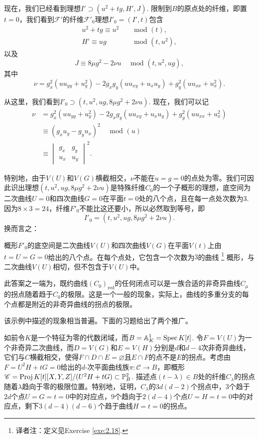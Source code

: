 现在，我们已经看到理想$I'\supset (u^2+tg,H',J)$. 限制到$B$的原点处的纤维，即置$t=0$，我们看到$\mathscr F'$的纤维$\mathscr F'_0$理想$I'_0=(I',t)$包含
\[
	\begin{aligned}
		u^2+tg \equiv u^2 &\quad \text{ mod } (t),\\
		H' \equiv ug &\quad \text{ mod } (t,u^2),
	\end{aligned}
\]
以及
\[
	J\equiv 8\mu g^2-2\nu u\quad \text{ mod } (t,u^2,ug),
\]
其中
\[
	\nu=g_x^2(uu_{yy}+u_y^2)-2g_xg_y(uu_{xy}+u_xu_y)+g_y^2(uu_{xx}+u_x^2).
\]

从这里，我们看到$I'_0\supset (t,u^2,ug,8\mu g^2+2\nu u)$. 现在，我们可以记
\[
	\begin{aligned}
		\nu &=g_x^2(uu_{yy}+u_y^2)-2g_xg_y(uu_{xy}+u_xu_y)+g_y^2(uu_{xx}+u_x^2)\\
		&\equiv (g_xu_y-g_yu_x)^2\quad \text{ mod } (u)\\
		&\equiv \begin{vmatrix}
			g_x&g_y\\
			u_x&u_y
		\end{vmatrix}^2.
	\end{aligned}
\]

特别地，由于$V(U)$和$V(G)$横截相交，$\nu$不能在$u=g=0$的点处为零。我们可因此识出理想$(t,u^2,ug,8\mu g^2+2\nu u)$是特殊纤维$C_0$的一个子概形的理想，底空间为二次曲线$U=0$和四次曲线$G=0$在平面$t=0$处的八个点，且在每一点处次数为$3$. 因为$8\times 3=24$，纤维$F'_0$不能比这还要小，所以必然取到等号，即
\[
	I'_0=(t,u^2,ug,8\mu g^2+2\nu u).
\]
换而言之：

\begin{pro}\label{pro:4.10}
	概形$F'_0$的底空间是二次曲线$V(U)$和四次曲线$V(G)$在平面$V(t)$上由$t=U=G=0$给出的八个点。在每个点处，它包含一个次数为$3$的曲线%
	\footnote{
		译者注：定义见Exercise \ref{exe:2.18}.
	}%
	概形，与二次曲线$V(U)$相切，但不包含于$V(U)$中。
\end{pro}

此答案之一端为，既约曲线$(C_0)_{\text{red}}$的任何闭点可以是一族合适的非奇异曲线$C_\mu$的拐点随着趋于$C_0$的极限。这是一个一般的现象，实际上，曲线的多重分支的每个点都是附近的非奇异曲线的拐点的极限。

该示例中描述的现象相当普遍。下面的习题给出了两个推广。

\begin{exe}\label{exe:4.11}
	如前令$K$是一个特征为零的代数闭域，而$B=\mathbb A_K^1=\operatorname{Spec} K[t]$. 令$F=V(U)$为一个非奇异二次曲线，而$D=V(G)$和$E=V(H)$分别是$d$和$d-4$次非奇异曲线，它们与$C$横截相交，使得$F\cap D\cap E=\varnothing$且$E\cap F$的点不是$E$的拐点。考虑由$F=U^2H+tG=0$给出的$d$-次平面曲线族$\pi:\mathscr C\to B$，即概形$\mathscr C=\operatorname{Proj} K[t][X,Y,Z]/(U^2H+tG)\subset \mathbb P_B^2$. 描述点$(t-\lambda)\in B$处的纤维$C_\lambda$的拐点随着$\lambda$趋向于零的极限位置。特别地，证明，$C_\lambda$的$3d(d-2)$个拐点中，$3$个趋于$2d$个点$U=G=t=0$中的对应点，$9$个趋向于$2(d-4)$个点$U=H=t=0$中的对应点，剩下$3(d-4)(d-6)$个趋于曲线$H=t=0$的拐点。
\end{exe}

